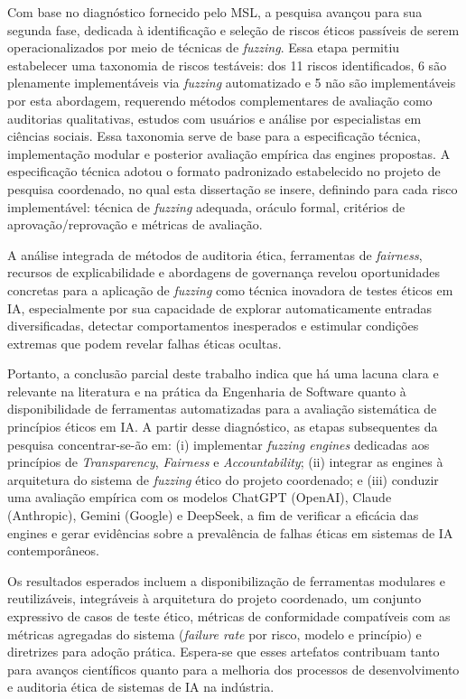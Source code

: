 Com base no diagnóstico fornecido pelo MSL, a pesquisa avançou para sua segunda fase, dedicada à identificação e seleção de riscos éticos passíveis de serem operacionalizados por meio de técnicas de \textit{fuzzing}. Essa etapa permitiu estabelecer uma taxonomia de riscos testáveis: dos 11 riscos identificados, 6 são plenamente implementáveis via \textit{fuzzing} automatizado e 5 não são implementáveis por esta abordagem, requerendo métodos complementares de avaliação como auditorias qualitativas, estudos com usuários e análise por especialistas em ciências sociais. Essa taxonomia serve de base para a especificação técnica, implementação modular e posterior avaliação empírica das engines propostas. A especificação técnica adotou o formato padronizado estabelecido no projeto de pesquisa coordenado, no qual esta dissertação se insere, definindo para cada risco implementável: técnica de \textit{fuzzing} adequada, oráculo formal, critérios de aprovação/reprovação e métricas de avaliação.

A análise integrada de métodos de auditoria ética, ferramentas de \textit{fairness}, recursos de explicabilidade e abordagens de governança revelou oportunidades concretas para a aplicação de \textit{fuzzing} como técnica inovadora de testes éticos em IA, especialmente por sua capacidade de explorar automaticamente entradas diversificadas, detectar comportamentos inesperados e estimular condições extremas que podem revelar falhas éticas ocultas.

Portanto, a conclusão parcial deste trabalho indica que há uma lacuna clara e relevante na literatura e na prática da Engenharia de Software quanto à disponibilidade de ferramentas automatizadas para a avaliação sistemática de princípios éticos em IA. A partir desse diagnóstico, as etapas subsequentes da pesquisa concentrar-se-ão em: (i) implementar \textit{fuzzing engines} dedicadas aos princípios de \textit{Transparency}, \textit{Fairness} e \textit{Accountability}; (ii) integrar as engines à arquitetura do sistema de \textit{fuzzing} ético do projeto coordenado; e (iii) conduzir uma avaliação empírica com os modelos ChatGPT (OpenAI), Claude (Anthropic), Gemini (Google) e DeepSeek, a fim de verificar a eficácia das engines e gerar evidências sobre a prevalência de falhas éticas em sistemas de IA contemporâneos.

Os resultados esperados incluem a disponibilização de ferramentas modulares e reutilizáveis, integráveis à arquitetura do projeto coordenado, um conjunto expressivo de casos de teste ético, métricas de conformidade compatíveis com as métricas agregadas do sistema (\textit{failure rate} por risco, modelo e princípio) e diretrizes para adoção prática. Espera-se que esses artefatos contribuam tanto para avanços científicos quanto para a melhoria dos processos de desenvolvimento e auditoria ética de sistemas de IA na indústria.